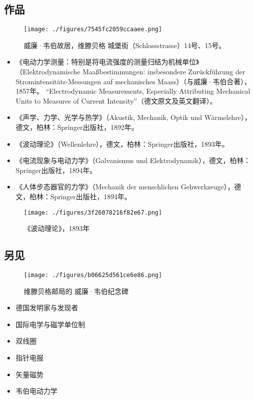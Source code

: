 \subsection{作品}
\begin{figure}[ht]
\centering
\texttt{[image: ./figures/7545fc2059ccaaee.png]}
\caption{威廉·韦伯故居，维滕贝格 城堡街（Schlossstrasse）14号、15号。} \label{fig_Eduard_2}
\end{figure}
\begin{itemize}
\item 《电动力学测量：特别是将电流强度的测量归结为机械单位》（Elektrodynamische Maaßbestimmungen: insbesondere Zurückführung der Stromintensitäts-Messungen auf mechanisches Maass）（与威廉·韦伯合著），1857年。  
   “Electrodynamic Measurements, Especially Attributing Mechanical Units to Measures of Current Intensity”（德文原文及英文翻译）。
\item 《声学、力学、光学与热学》（Akustik, Mechanik, Optik und Wärmelehre），德文，柏林：Springer出版社，1892年。
\item 《波动理论》（Wellenlehre），德文，柏林：Springer出版社，1893年。
\item 《电流现象与电动力学》（Galvanismus und Elektrodynamik），德文，柏林：Springer出版社，1894年。
\item 《人体步态器官的力学》（Mechanik der menschlichen Gehwerkzeuge），德文，柏林：Springer出版社，1894年。
\end{itemize}
\begin{figure}[ht]
\centering
\texttt{[image: ./figures/3f26078216f82e67.png]}
\caption{《波动理论》，1893年} \label{fig_Eduard_3}
\end{figure}
\subsection{另见}  
\begin{figure}[ht]
\centering
\texttt{[image: ./figures/b06625d561ce6e86.png]}
\caption{维滕贝格邮局的 威廉·韦伯纪念碑} \label{fig_Eduard_4}
\end{figure}
\begin{itemize}
\item 德国发明家与发现者  
\item 国际电学与磁学单位制  
\item 双线圈  
\item 指针电报  
\item 矢量磁势  
\item 韦伯电动力学
\end{itemize}
